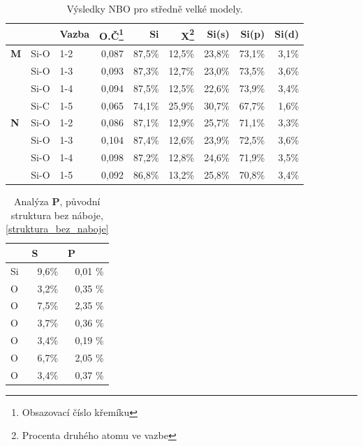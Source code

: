 \documentclass[
  digital, %
  table,   %
  lof,     %
  lot,     %
  oneside,
]{fithesis3}
\begin{document}
\begin{table}[htbp]
  \begin{minipage}{\textwidth}
\caption{Výsledky NBO pro středně velké modely.}
\begin{tabular}{|l|l|l|r|r|r|r|r|r|}
  \hline
  \label{nbo_small} &  & Vazba & O.Č\footnote{Obsazovací číslo křemíku} & Si & X\footnote{Procenta druhého atomu ve vazbe} & Si(s) & Si(p) &Si(d) \\ \hline
\textbf{M} & Si-O & 1-2 & 0,087 & 87,5\% & 12,5\% & 23,8\% & 73,1\% & 3,1\% \\ \hline
 & Si-O & 1-3 & 0,093 & 87,3\% & 12,7\% & 23,0\% & 73,5\% & 3,6\% \\ \hline
 & Si-O & 1-4 & 0,094 & 87,5\% & 12,5\% & 22,6\% & 73,9\% & 3,4\% \\ \hline
 & Si-C & 1-5 & 0,065 & 74,1\% & 25,9\% & 30,7\% & 67,7\% & 1,6\% \\ \hline
\textbf{N} & Si-O & 1-2 & 0,086 & 87,1\% & 12,9\% & 25,7\% & 71,1\% & 3,3\% \\ \hline
 & Si-O & 1-3 & 0,104 & 87,4\% & 12,6\% & 23,9\% & 72,5\% & 3,6\% \\ \hline
 & Si-O & 1-4 & 0,098 & 87,2\% & 12,8\% & 24,6\% & 71,9\% & 3,5\% \\ \hline
 & Si-O & 1-5 & 0,092 & 86,8\% & 13,2\% & 25,8\% & 70,8\% & 3,4\% \\ \hline
\end{tabular}
\end{minipage}
\end{table}




\begin{table}[htbp]
\caption{Analýza \textbf{P}, původní struktura bez náboje, \ref{struktura_bez_naboje}}
\begin{center}
\begin{tabular}{|l|r|r|}
\hline
 & \multicolumn{1}{l|}{S} & \multicolumn{1}{l|}{P} \\ \hline
Si & 9,6\% & 0,01 \% \\ \hline
O & 3,2\% & 0,35 \% \\ \hline
O & 7,5\% & 2,35 \% \\ \hline
O & 3,7\% & 0,36 \% \\ \hline
O & 3,4\% & 0,19 \% \\ \hline
O & 6,7\% & 2,05 \% \\ \hline
O & 3,4\% & 0,37 \% \\ \hline
\end{tabular}
\end{center}
\label{struktura_bez_naboje_MPA}
\end{table}
\end{document}
